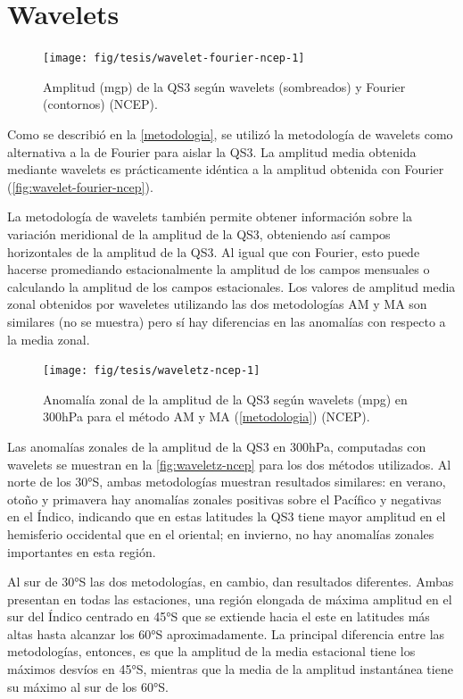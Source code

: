 \documentclass[spanish,a4paper,12pt,oneside]{book}
\begin{document}
\section*{Wavelets}

\begin{figure}
\texttt{[image: fig/tesis/wavelet-fourier-ncep-1]} \caption{Amplitud (mgp) de la QS3 según wavelets (sombreados) y Fourier (contornos) (NCEP).}\label{fig:wavelet-fourier-ncep}
\end{figure}

Como se describió en la \autoref{metodologia}, se utilizó la metodología
de wavelets como alternativa a la de Fourier para aislar la QS3. La
amplitud media obtenida mediante wavelets es prácticamente idéntica a la
amplitud obtenida con Fourier (\autoref{fig:wavelet-fourier-ncep}).

La metodología de wavelets también permite obtener información sobre la
variación meridional de la amplitud de la QS3, obteniendo así campos
horizontales de la amplitud de la QS3. Al igual que con Fourier, esto
puede hacerse promediando estacionalmente la amplitud de los campos
mensuales o calculando la amplitud de los campos estacionales. Los
valores de amplitud media zonal obtenidos por waveletes utilizando las
dos metodologías AM y MA son similares (no se muestra) pero sí hay
diferencias en las anomalías con respecto a la media zonal.

\begin{figure}

{\centering \texttt{[image: fig/tesis/waveletz-ncep-1]} 

}

\caption{Anomalía zonal de la amplitud de la QS3 según wavelets (mpg) en 300hPa para el método AM y MA (\autoref{metodologia}) (NCEP).}\label{fig:waveletz-ncep}
\end{figure}

Las anomalías zonales de la amplitud de la QS3 en 300hPa, computadas con
wavelets se muestran en la \autoref{fig:waveletz-ncep} para los dos
métodos utilizados. Al norte de los 30°S, ambas metodologías muestran
resultados similares: en verano, otoño y primavera hay anomalías zonales
positivas sobre el Pacífico y negativas en el Índico, indicando que en
estas latitudes la QS3 tiene mayor amplitud en el hemisferio occidental
que en el oriental; en invierno, no hay anomalías zonales importantes en
esta región.

Al sur de 30°S las dos metodologías, en cambio, dan resultados
diferentes. Ambas presentan en todas las estaciones, una región elongada
de máxima amplitud en el sur del Índico centrado en 45°S que se extiende
hacia el este en latitudes más altas hasta alcanzar los 60°S
aproximadamente. La principal diferencia entre las metodologías,
entonces, es que la amplitud de la media estacional tiene los máximos
desvíos en 45°S, mientras que la media de la amplitud instantánea tiene
su máximo al sur de los 60°S.
\end{document}
